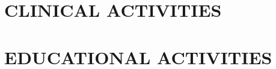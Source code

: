 \documentclass[11pt]{article}
\begin{document}
\section*{CLINICAL ACTIVITIES \ {}} 


	





\section*{EDUCATIONAL ACTIVITIES} 
\end{document}
